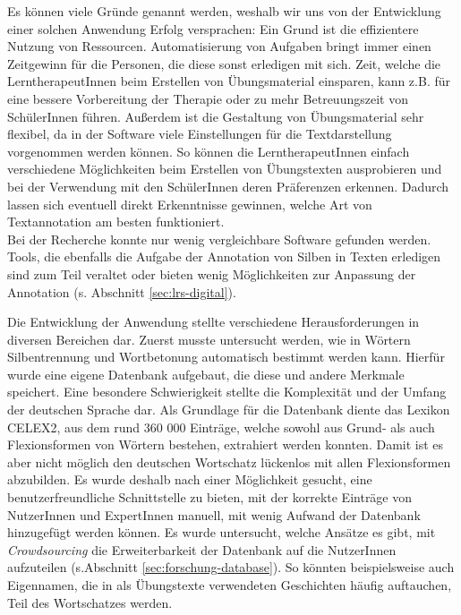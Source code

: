 Es können viele Gründe genannt werden, weshalb wir uns von der Entwicklung einer solchen Anwendung Erfolg versprachen: Ein Grund ist die effizientere Nutzung von Ressourcen. Automatisierung von Aufgaben bringt immer einen Zeitgewinn für die Personen, die diese sonst erledigen mit sich. Zeit, welche die LerntherapeutInnen beim Erstellen von Übungsmaterial einsparen, kann z.B. für eine bessere Vorbereitung der Therapie oder zu mehr Betreuungszeit von SchülerInnen führen. Außerdem ist die Gestaltung von Übungsmaterial sehr flexibel, da in der Software viele Einstellungen für die Textdarstellung vorgenommen werden können. So können die LerntherapeutInnen einfach verschiedene Möglichkeiten beim Erstellen von Übungstexten ausprobieren und bei der Verwendung mit den SchülerInnen deren Präferenzen erkennen. Dadurch lassen sich eventuell direkt Erkenntnisse gewinnen, welche Art von Textannotation am besten funktioniert.\\
Bei der Recherche konnte nur wenig vergleichbare Software gefunden werden. Tools, die ebenfalls die Aufgabe der Annotation von Silben in Texten erledigen sind zum Teil veraltet oder bieten wenig Möglichkeiten zur Anpassung der Annotation (s. Abschnitt \ref{sec:lrs-digital}).

Die Entwicklung der Anwendung stellte verschiedene Herausforderungen in diversen Bereichen dar. Zuerst musste untersucht werden, wie in Wörtern Silbentrennung und Wortbetonung automatisch bestimmt werden kann. Hierfür wurde eine eigene Datenbank aufgebaut, die diese und andere Merkmale speichert. Eine besondere Schwierigkeit stellte die Komplexität und der Umfang der deutschen Sprache dar. Als Grundlage für die Datenbank diente das Lexikon CELEX2\cite{Burnage1990}, aus dem rund 360 000 Einträge, welche sowohl aus Grund- als auch Flexionsformen von Wörtern bestehen, extrahiert werden konnten. Damit ist es aber nicht möglich den deutschen Wortschatz lückenlos mit allen Flexionsformen abzubilden. Es wurde deshalb nach einer Möglichkeit gesucht, eine benutzerfreundliche Schnittstelle zu bieten, mit der korrekte Einträge von NutzerInnen und ExpertInnen manuell, mit wenig Aufwand der Datenbank hinzugefügt werden können. Es wurde untersucht, welche Ansätze es gibt, mit \textit{Crowdsourcing} die Erweiterbarkeit der Datenbank auf die NutzerInnen aufzuteilen (s.Abschnitt \ref{sec:forschung-database}). So könnten beispielsweise auch Eigennamen, die in als Übungstexte verwendeten Geschichten häufig auftauchen, Teil des Wortschatzes werden.\\

